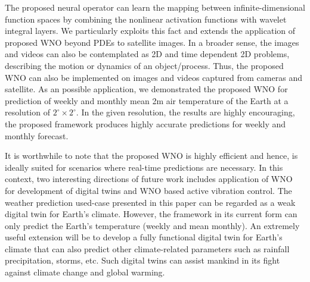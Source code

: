\documentclass{article}
\begin{document}
The proposed neural operator can learn the mapping between infinite-dimensional function spaces by combining the nonlinear activation functions with wavelet integral layers. We particularly exploits this fact and extends the application of proposed WNO beyond PDEs to satellite images. In a broader sense, the images and videos can also be contemplated as 2D and time dependent 2D problems, describing the motion or dynamics of an object/process. Thus, the proposed WNO can also be implemented on images and videos captured from cameras and satellite. As an possible application, we demonstrated the proposed WNO for prediction of weekly and monthly mean 2m air temperature of the Earth at a resolution of $2^{\circ} \times 2^{\circ}$. In the given resolution, the results are highly encouraging, the proposed framework produces highly accurate predictions for weekly and monthly forecast. 

It is worthwhile to note that the proposed WNO is highly efficient and hence, is ideally suited for scenarios where real-time predictions are necessary.
In this context, two interesting directions of future work includes application of WNO for development of digital twins and WNO based active vibration control. The weather prediction used-case presented in this paper can be regarded as a weak digital twin for Earth's climate. However, the framework in its current form can only predict the Earth's temperature (weekly and mean monthly). An extremely useful extension will be to develop a fully functional digital twin for Earth's climate that can also predict other climate-related parameters such as rainfall precipitation, storms, etc. Such digital twins can assist mankind in its fight against climate change and global warming. 

\end{document}
